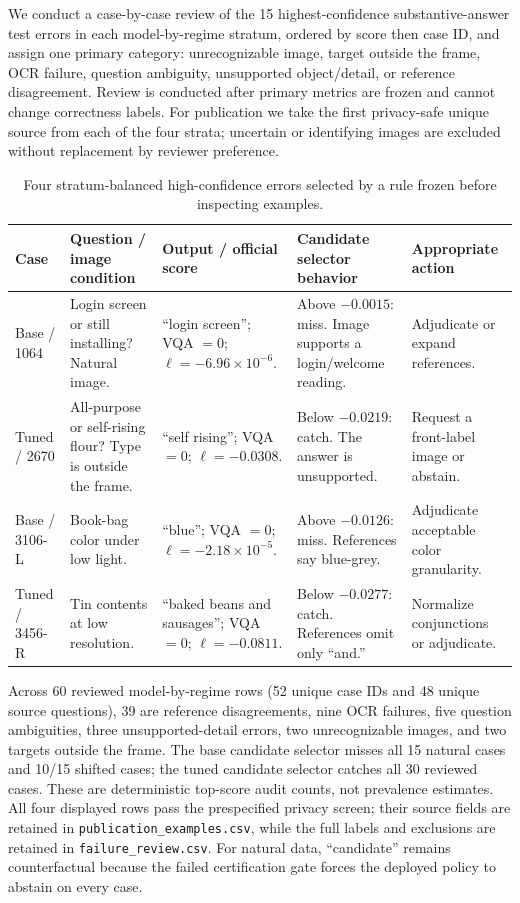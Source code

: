 \documentclass[11pt]{article}
\begin{document}
We conduct a case-by-case review of the 15 highest-confidence
substantive-answer test errors in each model-by-regime stratum, ordered by score then
case ID, and assign one primary category:
unrecognizable image, target outside the frame, OCR failure, question ambiguity,
unsupported object/detail, or reference disagreement.  Review is conducted after
primary metrics are frozen and cannot change correctness labels.  For publication we
take the first privacy-safe unique source from each of the four strata; uncertain or
identifying images are excluded without replacement by reviewer preference.

\begin{table}[t]
\centering
\caption{Four stratum-balanced high-confidence errors selected by a rule frozen before
inspecting examples.}
\label{tab:examples}
\small
\setlength{\tabcolsep}{3pt}
\begin{tabular}{P{0.11\textwidth}P{0.21\textwidth}P{0.20\textwidth}P{0.18\textwidth}P{0.19\textwidth}}
\toprule
Case & Question / image condition & Output / official score & Candidate selector behavior & Appropriate action \\
\midrule
Base / 1064 & Login screen or still installing? Natural image. &
``login screen''; VQA $=0$; $\ell=-6.96\!\times\!10^{-6}$. &
Above $-0.0015$: miss. Image supports a login/welcome reading. &
Adjudicate or expand references. \\
Tuned / 2670 & All-purpose or self-rising flour? Type is outside the frame. &
``self rising''; VQA $=0$; $\ell=-0.0308$. &
Below $-0.0219$: catch. The answer is unsupported. &
Request a front-label image or abstain. \\
Base / 3106-L & Book-bag color under low light. &
``blue''; VQA $=0$; $\ell=-2.18\!\times\!10^{-5}$. &
Above $-0.0126$: miss. References say blue-grey. &
Adjudicate acceptable color granularity. \\
Tuned / 3456-R & Tin contents at low resolution. &
``baked beans and sausages''; VQA $=0$; $\ell=-0.0811$. &
Below $-0.0277$: catch. References omit only ``and.'' &
Normalize conjunctions or adjudicate. \\
\bottomrule
\end{tabular}
\end{table}

Across 60 reviewed model-by-regime rows (52 unique case IDs and 48 unique source
questions), 39 are reference disagreements, nine OCR failures, five question
ambiguities, three unsupported-detail errors, two unrecognizable images, and two
targets outside the frame.  The base candidate selector misses all
15 natural cases and 10/15 shifted cases; the tuned candidate selector catches all
30 reviewed cases.  These are deterministic top-score audit counts, not prevalence
estimates.  All four displayed rows pass the prespecified privacy screen; their
source fields are retained in \texttt{publication\_examples.csv}, while the full
labels and exclusions are retained in \texttt{failure\_review.csv}.  For natural
data, ``candidate'' remains counterfactual because the failed certification gate
forces the deployed policy to abstain on every case.
\end{document}
